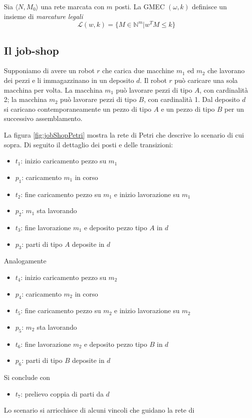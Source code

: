 \documentclass[a4paper]{report}
\begin{document}
Sia $\langle N, M_0 \rangle$ una rete marcata con $m$ posti. La GMEC
$(\omega,k)$ definisce un insieme di {\em marcature legali}
\[
\mathcal{L}(w,k) = \{ M \in \mathbb{N}^m | w^T M \leq k \}
\]
\subsection{Il job-shop}
Supponiamo di avere un robot $r$ che carica due macchine $m_1$ ed
$m_2$ che lavorano dei pezzi e li immagazzinano in un deposito $d$. Il
robot $r$ pu\`o caricare una sola macchina per volta. La macchina
$m_1$ pu\`o lavorare pezzi di tipo $A$, con cardinalit\`a 2; la
macchina $m_2$ pu\`o lavorare pezzi di tipo $B$, con cardinalit\`a
1. Dal deposito $d$ si caricano contemporaneamente un pezzo di tipo
$A$ e un pezzo di tipo $B$ per un successivo assemblamento.

La figura \ref{fig:jobShopPetri} mostra la rete di Petri che descrive
lo scenario di cui sopra. Di seguito il dettaglio dei posti e delle
transizioni:
\begin{itemize}
\item $t_1$: inizio caricamento pezzo su $m_1$
\item $p_1$: caricamento $m_1$ in corso
\item $t_2$: fine caricamento pezzo su $m_1$ e inizio lavorazione su
  $m_1$
\item $p_2$: $m_1$ sta lavorando
\item $t_3$: fine lavorazione $m_1$ e deposito pezzo tipo $A$ in $d$
\item $p_3$: parti di tipo $A$ deposite in $d$
\end{itemize}
Analogamente
\begin{itemize}
\item $t_4$: inizio caricamento pezzo su $m_2$
\item $p_4$: caricamento $m_2$ in corso
\item $t_5$: fine caricamento pezzo su $m_2$ e inizio lavorazione su
  $m_2$
\item $p_5$: $m_2$ sta lavorando
\item $t_6$: fine lavorazione $m_2$ e deposito pezzo tipo $B$ in $d$
\item $p_6$: parti di tipo $B$ deposite in $d$
\end{itemize}
Si conclude con
\begin{itemize}
\item $t_7$: prelievo coppia di parti da $d$
\end{itemize}
Lo scenario si arricchisce di alcuni vincoli che guidano la rete di
\end{document}
